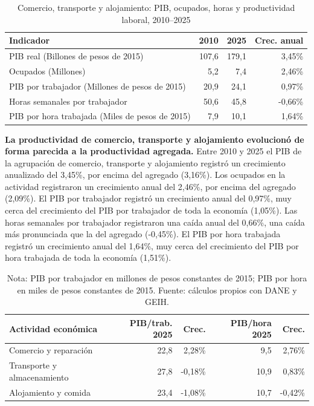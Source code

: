 \begin{table}[H]
\centering
\caption{Comercio, transporte y alojamiento: PIB, ocupados, horas y productividad laboral, 2010--2025}
\label{tab:sector_g_h_i_productividad}
\small
\begin{tabular}{lrrr}
\toprule
Indicador & 2010 & 2025 & Crec. anual \\
\midrule
PIB real  (Billones de pesos de 2015) & 107,6 & 179,1 & 3,45\% \\
Ocupados (Millones) & 5,2 & 7,4 & 2,46\% \\
PIB por trabajador (Millones de pesos de 2015) & 20,9 & 24,1 & 0,97\% \\
Horas semanales por trabajador & 50,6 & 45,8 & -0,66\% \\
PIB por hora trabajada (Miles de pesos de 2015) & 7,9 & 10,1 & 1,64\% \\
\bottomrule
\end{tabular}
\end{table}

\textbf{La productividad de comercio, transporte y alojamiento evolucionó de forma parecida a la productividad agregada.} Entre 2010 y 2025 el PIB de la agrupación de comercio, transporte y alojamiento registró un crecimiento anualizado del 3,45\%, por encima del agregado (3,16\%). Los ocupados en la actividad registraron un crecimiento anual del 2,46\%, por encima del agregado (2,09\%). El PIB por trabajador registró un crecimiento anual del 0,97\%, muy cerca del crecimiento del PIB por trabajador de toda la economía (1,05\%). Las horas semanales por trabajador registraron una caída anual del 0,66\%, una caída más pronunciada que la del agregado (-0,45\%). El PIB por hora trabajada registró un crecimiento anual del 1,64\%, muy cerca del crecimiento del PIB por hora trabajada de toda la economía (1,51\%).

\begin{table}[H]
\centering
\caption{Productividad laboral de las actividades de comercio, transporte y alojamiento, 2010--2025}
\label{tab:sector_g_h_i_zoom25}
\small
\begin{tabular}{p{}rrrr}
\toprule
Actividad económica & PIB/trab. 2025 & Crec. & PIB/hora 2025 & Crec. \\
\midrule
Comercio y reparación & 22,8 & 2,28\% & 9,5 & 2,76\% \\
Transporte y almacenamiento & 27,8 & -0,18\% & 10,9 & 0,83\% \\
Alojamiento y comida & 23,4 & -1,08\% & 10,7 & -0,42\% \\
\bottomrule
\end{tabular}
\caption*{\footnotesize Nota: PIB por trabajador en millones de pesos constantes de 2015; PIB por hora en miles de pesos constantes de 2015. Fuente: cálculos propios con DANE y GEIH.}
\end{table}

